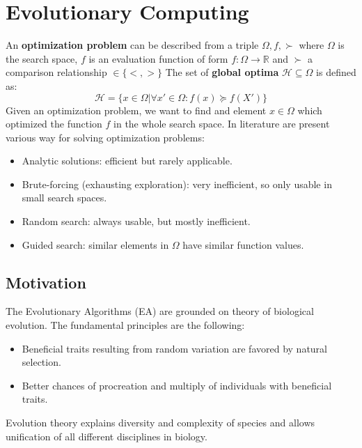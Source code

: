 \documentclass{article}
\begin{document}
\section{Evolutionary Computing}
An \textbf{optimization problem} can be described from a triple $\Omega,f,\succ$ where $\Omega$
is the search space, $f$ is an evaluation function of form $f:\Omega\rightarrow\mathbb{R}$ and
$\succ$ a comparison relationship $\in\{<,>\}$
The set of \textbf{global optima} $\mathcal{H}\subseteq\Omega$ is defined as:
$$\mathcal{H}=\{x\in\Omega|\forall x'\in\Omega : f(x)\succeq f(X')\}$$
Given an optimization problem, we want to find and element $x\in\Omega$ which optimized
the function $f$ in the whole search space. In literature are present various way
for solving optimization problems:
\begin{itemize}
    \item Analytic solutions: efficient but rarely applicable.
    \item Brute-forcing (exhausting exploration): very inefficient, so only usable in small search spaces.
    \item Random search: always usable, but mostly inefficient.
    \item Guided search: similar elements in $\Omega$ have similar function values.
\end{itemize}

\subsection{Motivation}
The Evolutionary Algorithms (EA) are grounded on theory of biological evolution. The fundamental
principles are the following:
\begin{itemize}
    \item Beneficial traits resulting from random variation are favored by natural selection.
    \item Better chances of procreation and multiply of individuals with beneficial traits.
\end{itemize}
Evolution theory explains diversity and complexity of species and allows unification of all different
disciplines in biology.
\end{document}
